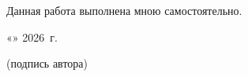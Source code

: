 \noindent
Данная работа выполнена мною самостоятельно.

\vspace{2.5em}

\noindent
«\underline{\hspace{1.2cm}}» \underline{\hspace{3.2cm}} 2026~г.
\hfill\underline{\hspace{4.5cm}}

\vspace{0.8em}

\noindent
\hfill {\small (подпись автора)}
